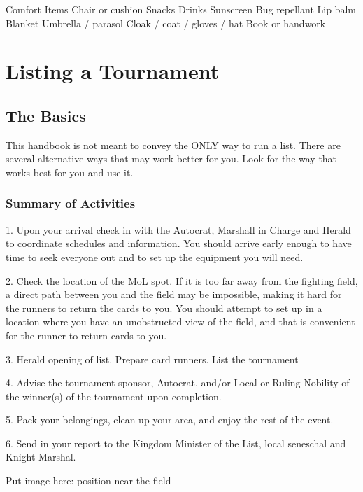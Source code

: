 \documentclass{article}
\begin{document}
Comfort Items
Chair or cushion
Snacks
Drinks
Sunscreen
Bug repellant
Lip balm
Blanket
Umbrella / parasol
Cloak / coat / gloves / hat
Book or handwork


\section{Listing a Tournament}
\subsection{The Basics}
This handbook is not meant to convey the ONLY way to run a list. There are several alternative ways that
may work better for you. Look for the way that works best for you and use it.
\subsubsection{Summary of Activities}

1. Upon your arrival check in with the Autocrat, Marshall in Charge and Herald to coordinate
schedules and information. You should arrive early enough to have time to seek everyone out and to
set up the equipment you will need.

2. Check the location of the MoL spot. If it is too far away from the fighting field, a direct path
between you and the field may be impossible, making it hard for the runners to return the cards to
you. You should attempt to set up in a location where you have an unobstructed view of the field,
and that is convenient for the runner to return cards to you.

3. Herald opening of list. Prepare card runners. List the tournament

4. Advise the tournament sponsor, Autocrat, and/or Local or Ruling Nobility of the winner(s) of the
tournament upon completion.

5. Pack your belongings, clean up your area, and enjoy the rest of the event.

6. Send in your report to the Kingdom Minister of the List, local seneschal and Knight Marshal.



Put image here: position near the field
\end{document}
